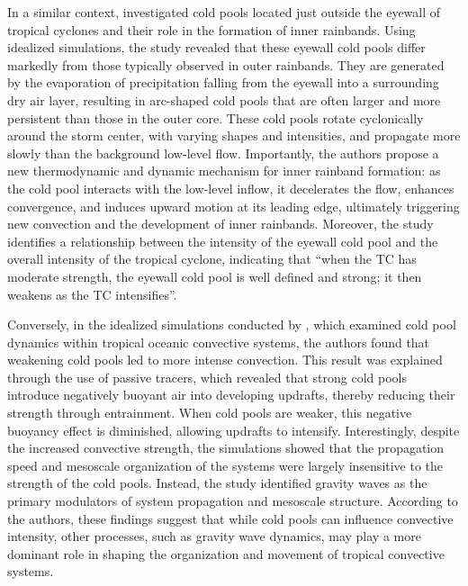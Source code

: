 In a similar context,  investigated cold pools located just outside the eyewall of tropical cyclones and their role in the formation of inner rainbands. Using idealized simulations, the study revealed that these eyewall cold pools differ markedly from those typically observed in outer rainbands. They are generated by the evaporation of precipitation falling from the eyewall into a surrounding dry air layer, resulting in arc-shaped cold pools that are often larger and more persistent than those in the outer core. These cold pools rotate cyclonically around the storm center, with varying shapes and intensities, and propagate more slowly than the background low-level flow. Importantly, the authors propose a new thermodynamic and dynamic mechanism for inner rainband formation: as the cold pool interacts with the low-level inflow, it decelerates the flow, enhances convergence, and induces upward motion at its leading edge, ultimately triggering new convection and the development of inner rainbands. Moreover, the study identifies a relationship between the intensity of the eyewall cold pool and the overall intensity of the tropical cyclone, indicating that “when the TC has moderate strength, the eyewall cold pool is well deﬁned and strong; it then weakens as the TC intensiﬁes”.

Conversely, in the idealized simulations conducted by , which examined cold pool dynamics within tropical oceanic convective systems, the authors found that weakening cold pools led to more intense convection. This result was explained through the use of passive tracers, which revealed that strong cold pools introduce negatively buoyant air into developing updrafts, thereby reducing their strength through entrainment. When cold pools are weaker, this negative buoyancy effect is diminished, allowing updrafts to intensify. Interestingly, despite the increased convective strength, the simulations showed that the propagation speed and mesoscale organization of the systems were largely insensitive to the strength of the cold pools. Instead, the study identified gravity waves as the primary modulators of system propagation and mesoscale structure. According to the authors, these findings suggest that while cold pools can influence convective intensity, other processes, such as gravity wave dynamics, may play a more dominant role in shaping the organization and movement of tropical convective systems.

